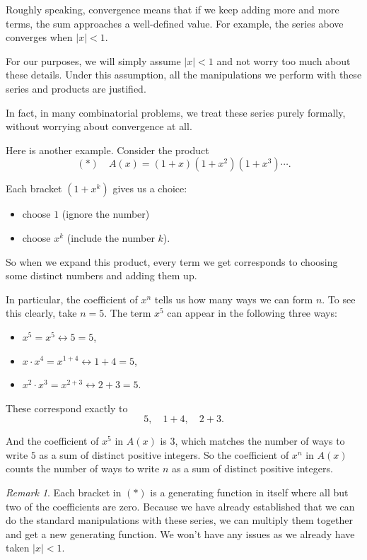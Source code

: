 \documentclass[11pt]{scrartcl}
\theoremstyle{plain}
\theoremstyle{definition}
\theoremstyle{remark}
\newtheorem{remark}{Remark}
\newcounter{problem}
\begin{document}
\noindent Roughly speaking, convergence means that if we keep adding more and more terms, the sum approaches a well-defined value. For example, the series above converges when $|x| < 1$.

\bigskip

\noindent For our purposes, we will simply assume $|x| < 1$ and not worry too much about these details. Under this assumption, all the manipulations we perform with these series and products are justified.

\bigskip

\noindent In fact, in many combinatorial problems, we treat these series purely formally, without worrying about convergence at all.

\bigskip

\noindent Here is another example. Consider the product
\[
(*)\quad A(x) = (1+x)(1+x^2)(1+x^3)\cdots.
\]

\noindent Each bracket $(1+x^k)$ gives us a choice:
\begin{itemize}
\item choose $1$ (ignore the number)
\item choose $x^k$ (include the number $k$).
\end{itemize}

\noindent So when we expand this product, every term we get corresponds to choosing some distinct numbers and adding them up.

\bigskip

\noindent In particular, the coefficient of $x^n$ tells us how many ways we can form $n$. To see this clearly, take $n=5$. The term $x^5$ can appear in the following three ways:
\begin{itemize}
    \item $x^5 = x^5 \longleftrightarrow 5 = 5$,
    \item $x \cdot x^4 = x^{1+4} \longleftrightarrow 1+4 = 5$,
    \item $x^2 \cdot x^3 = x^{2+3} \longleftrightarrow 2+3 = 5$.
\end{itemize}
These correspond exactly to
\[
5,\quad 1+4,\quad 2+3.
\]

\noindent And the coefficient of $x^5$ in $A(x)$ is $3$, which matches the number of ways to write $5$ as a sum of distinct positive integers. So the coefficient of $x^n$ in $A(x)$ counts the number of ways to write $n$ as a sum of distinct positive integers.

\begin{remark}
    Each bracket in $(*)$ is a generating function in itself where all but two of the coefficients are zero. Because we have already established that we can do the standard manipulations with these series, we can multiply them together and get a new generating function. We won't have any issues as we already have taken $|x| < 1$.
\end{remark}
\end{document}
